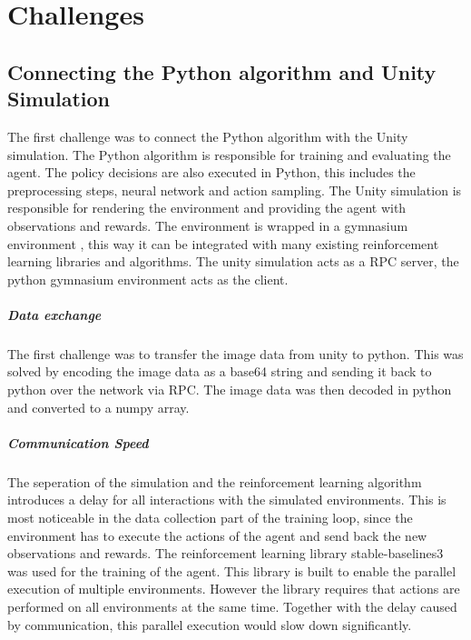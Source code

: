\chapter{Challenges}
\label{cha:challenges}

\section{Connecting the Python algorithm and Unity Simulation}

The first challenge was to connect the Python algorithm with the Unity simulation. The Python algorithm is responsible for training and evaluating the agent. The policy decisions are also executed in Python, this includes the preprocessing steps, neural network and action sampling. The Unity simulation is responsible for rendering the environment and providing the agent with observations and rewards. The environment is wrapped in a gymnasium environment \textcite{gymnasium}, this way it can be integrated with many existing reinforcement learning libraries and algorithms. The unity simulation acts as a \acs{RPC} server, the python gymnasium environment acts as the client.

\paragraph{Data exchange}
The first challenge was to transfer the image data from unity to python. This was solved by encoding the image data as a base64 string and sending it back to python over the network via \acs{RPC}. The image data was then decoded in python and converted to a numpy array.

\paragraph{Communication Speed}
The seperation of the simulation and the reinforcement learning algorithm introduces a delay for all interactions with the simulated environments. This is most noticeable in the data collection part of the training loop, since the environment has to execute the actions of the agent and send back the new observations and rewards. 
The reinforcement learning library stable-baselines3 \textcite{sb3} was used for the training of the agent. This library is built to enable the parallel execution of multiple environments. However the library requires that actions are performed on all environments at the same time. Together with the delay caused by communication, this parallel execution would slow down significantly.

